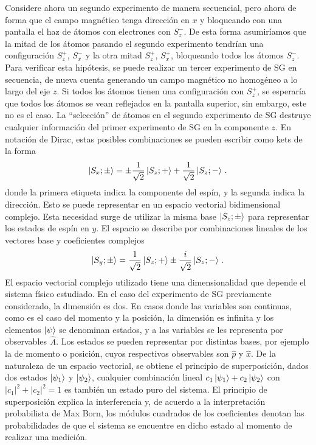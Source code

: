 Considere ahora un segundo experimento de manera secuencial, pero ahora de forma que el campo magnético tenga dirección en $x$ y bloqueando con una pantalla el haz de átomos con electrones con $S_z^-$. De esta forma asumiríamos que la mitad de los átomos pasando el segundo experimento tendrían una configuración $S_z^+$, $S_x^-$ y la otra mitad $S_z^+$, $S_x^+$, bloqueando todos los átomos $S_z^-$. Para verificar esta hipótesis, se puede realizar un tercer experimento de SG en secuencia, de nueva cuenta generando un campo magnético no homogéneo a lo largo del eje $z$. Si todos los átomos tienen una configuración con $S_z^+$, se esperaría que todos los átomos se vean reflejados en la pantalla superior, sin embargo, este no es el caso. La ``selección'' de átomos en el segundo experimento de SG destruye cualquier información del primer experimento de SG en la componente $z$. En notación de Dirac, estas posibles combinaciones se pueden escribir como kets de la forma
\begin{equation}
  \label{1.1}
  \ket{S_x; \pm} = \pm \frac{1}{\sqrt{2}}\ket{S_z; +} + \frac{1}{\sqrt{2}}\ket{S_z; -}\,.
\end{equation}
donde la primera etiqueta indica la componente del espín, y la segunda indica la dirección. Esto se puede representar en un espacio vectorial bidimensional complejo. Esta necesidad surge de utilizar la misma base $\ket{S_z; \pm}$ para representar los estados de espín en $y$. El espacio se describe por combinaciones lineales de los vectores base y coeficientes complejos
\begin{equation}
  \label{1.2}
  \ket{S_y; \pm} = \frac{1}{\sqrt{2}}\ket{S_z; +} \pm \frac{i}{\sqrt{2}}\ket{S_z; -}\,.
\end{equation}
El espacio vectorial complejo utilizado tiene una dimensionalidad que depende el sistema físico estudiado. En el caso del experimento de SG previamente considerado, la dimensión es dos. En casos donde las variables son continuas, como es el caso del momento y la posición, la dimensión es infinita y los elementos $\ket{\psi}$ se denominan estados, y a las variables se les representa por observables $\hat{A}$. Los estados se pueden representar por distintas bases, por ejemplo la de momento o posición, cuyos respectivos observables son $\hat{p}$ y $\hat{x}$. De la naturaleza de un espacio vectorial, se obtiene el principio de superposición, dados dos estados $\ket{\psi_1}$ y $\ket{\psi_2}$, cualquier combinación lineal $c_1 \ket{\psi_1} + c_2 \ket{\psi_2}$ con $|c_1|^2 + |c_2|^2 = 1$ es también un estado puro del sistema. El principio de superposición explica la interferencia y, de acuerdo a la interpretación probabilista de Max Born, los módulos cuadrados de los coeficientes denotan las probabilidades de que el sistema se encuentre en dicho estado al momento de realizar una medición.

